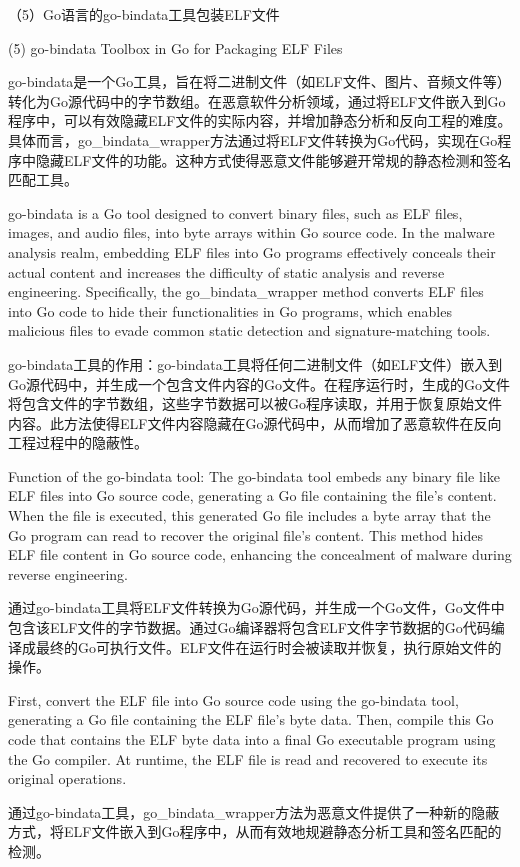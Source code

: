（5）Go语言的go-bindata工具包装ELF文件

(5) go-bindata Toolbox in Go for Packaging ELF Files

go-bindata是一个Go工具，旨在将二进制文件（如ELF文件、图片、音频文件等）转化为Go源代码中的字节数组。在恶意软件分析领域，通过将ELF文件嵌入到Go程序中，可以有效隐藏ELF文件的实际内容，并增加静态分析和反向工程的难度。具体而言，go\_bindata\_wrapper方法通过将ELF文件转换为Go代码，实现在Go程序中隐藏ELF文件的功能。这种方式使得恶意文件能够避开常规的静态检测和签名匹配工具。

go-bindata is a Go tool designed to convert binary files, such as ELF files, images, and audio files, into byte arrays within Go source code. In the malware analysis realm, embedding ELF files into Go programs effectively conceals their actual content and increases the difficulty of static analysis and reverse engineering. Specifically, the go\_bindata\_wrapper method converts ELF files into Go code to hide their functionalities in Go programs, which enables malicious files to evade common static detection and signature-matching tools.

go-bindata工具的作用：go-bindata工具将任何二进制文件（如ELF文件）嵌入到Go源代码中，并生成一个包含文件内容的Go文件。在程序运行时，生成的Go文件将包含文件的字节数组，这些字节数据可以被Go程序读取，并用于恢复原始文件内容。此方法使得ELF文件内容隐藏在Go源代码中，从而增加了恶意软件在反向工程过程中的隐蔽性。

Function of the go-bindata tool: The go-bindata tool embeds any binary file like ELF files into Go source code, generating a Go file containing the file's content. When the file is executed, this generated Go file includes a byte array that the Go program can read to recover the original file's content. This method hides ELF file content in Go source code, enhancing the concealment of malware during reverse engineering.

通过go-bindata工具将ELF文件转换为Go源代码，并生成一个Go文件，Go文件中包含该ELF文件的字节数据。通过Go编译器将包含ELF文件字节数据的Go代码编译成最终的Go可执行文件。ELF文件在运行时会被读取并恢复，执行原始文件的操作。

First, convert the ELF file into Go source code using the go-bindata tool, generating a Go file containing the ELF file's byte data. Then, compile this Go code that contains the ELF byte data into a final Go executable program using the Go compiler. At runtime, the ELF file is read and recovered to execute its original operations.

通过go-bindata工具，go\_bindata\_wrapper方法为恶意文件提供了一种新的隐蔽方式，将ELF文件嵌入到Go程序中，从而有效地规避静态分析工具和签名匹配的检测。

